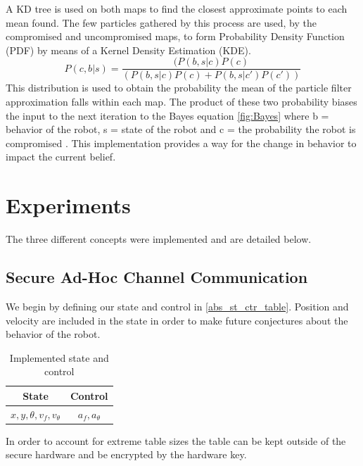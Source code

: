 \documentclass[conference]{IEEEtran}
\begin{document}
A KD tree is used on both maps to find the closest approximate points to each mean found. The few particles gathered by this process are used, by the compromised and uncompromised maps, to form Probability Density Function (PDF) by means of a Kernel Density Estimation (KDE). 
\begin{equation}
 P(c,b|s) =\frac {(P(b,s|c)P(c)} {(P(b,s|c)P(c) + 
 P(b,s|c' )P(c' ))} 
 \label{fig:Bayes}
\end{equation}
This distribution is used to obtain the probability the mean of the particle filter approximation falls within each map. The product of these two probability biases the input to the next iteration to the Bayes equation \ref{fig:Bayes} where b = behavior of the robot, s = state of the robot and c = the probability the robot is compromised \cite{Thrun2002Probabilistic}. This implementation provides a way for the change in behavior to impact the current belief.


\section{Experiments} \label{Experiments}

The three different concepts were implemented and are detailed below.

\subsection{Secure Ad-Hoc Channel Communication}

We begin by defining our state and control in \autoref{abs_st_ctr_table}. Position and velocity are included in the state in order to make future conjectures about the behavior of the robot.

\begin{table}[] \label{abs_st_ctr_table} \caption{Implemented state and control}
\begin{center}
\begin{tabular}{|c|c|}
\hline
State & Control\\
\hline
$x,y,\theta,v_f,v_\theta$ & $a_f,a_\theta$\\
\hline
\end{tabular}
\end{center}
\end{table}

In order to account for extreme table sizes the table can be kept outside of the secure hardware and be encrypted by the hardware key.
\end{document}
